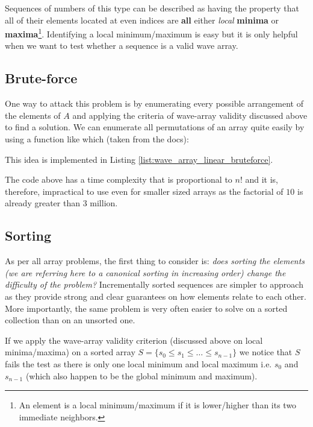 Sequences of numbers of this type can be described as having the property that all of their elements located at even indices are \textbf{all} either 
\textit{local}  \textbf{minima} or  \textbf{maxima}\footnote{An element is a local minimum/maximum if it is lower/higher than its two immediate neighbors.}. 
Identifying a local minimum/maximum is easy but it is only helpful when we want to test whether a sequence is a valid wave array.

\subsection{Brute-force}
\label{wave_array:sec:bruteforce}
One way to attack this problem is by enumerating every possible arrangement of the elements of $A$ and applying the criteria of wave-array validity discussed above to find a solution. 
We can enumerate all permutations of an array quite easily by using a function like  which (taken from the docs): \quoteblock{\quotes{Rearranges the elements in the range [first,last) into the next lexicographically greater permutation}.}

This idea is implemented in Listing \ref{list:wave_array_linear_bruteforce}.



The code above has a time complexity that is proportional to $n!$ and it is, therefore, impractical to use even for smaller sized arrays as the factorial of $10$ is already greater than $3$ million. 

\subsection{Sorting}
\label{wave_array:sec:sorting}
As per all array problems, the first thing to consider is: \textit{does sorting the elements (we are referring here to a canonical sorting in increasing order) change the difficulty of the problem?}
Incrementally sorted sequences are simpler to approach as they provide strong and clear guarantees on how elements relate to each other. More importantly, the same problem is very often easier to solve on a sorted collection than on an unsorted one.
 
If we apply the wave-array validity criterion (discussed above on local minima/maxima) on a sorted array $S=\{s_0 \leq s_1 \leq \ldots \leq s_{n-1}\}$ we notice that $S$ fails the test as there is only one local minimum and local maximum i.e. $s_0$ and $s_{n-1}$ (which also happen to be the global minimum and maximum).

